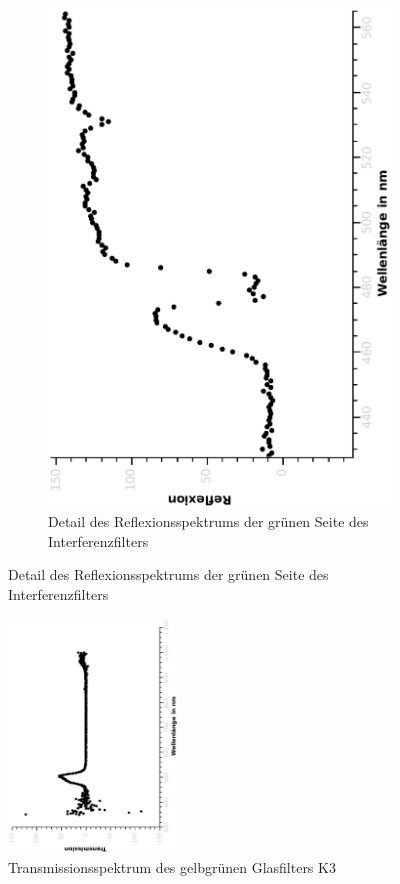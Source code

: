 \documentclass{article}
\begin{document}
\begin{figure}[H]
\begin{subfigure}[h]{0.4\textwidth}
\includegraphics[width=\textwidth ,angle=-90]{eps/interrefldetail.eps}
\caption{Detail des Reflexionsspektrums der grünen Seite des Interferenzfilters}
\end{subfigure}
\end{figure}

\begin{figure}
\centering
\includegraphics[width=0.4\textwidth, angle=-90]{eps/glasfilterk3.eps}
\caption{Transmissionsspektrum des gelbgrünen Glasfilters K3}
\end{figure}
\end{document}
